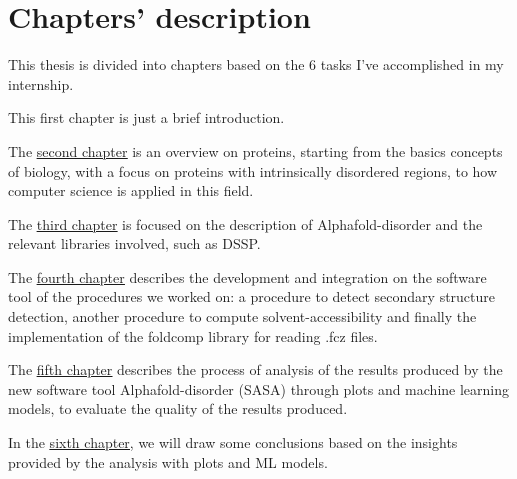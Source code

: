 \section{Chapters' description}
This thesis is divided into chapters based on the 6 tasks I've accomplished in my internship.

This first chapter is just a brief introduction.

The \underline{\hyperref[chp:proteins]{second chapter}} is an overview on proteins, starting from the basics concepts of biology, with a focus on proteins with intrinsically disordered regions, to how computer science is applied in this field.

The \underline{\hyperref[chp:alphafold-disorder]{third chapter}} is focused on the description of Alphafold-disorder and the relevant libraries involved, such as DSSP.

The \underline{\hyperref[chp:development]{fourth chapter}} describes the development and integration on the software tool of the procedures we worked on: a procedure to detect secondary structure detection, another procedure to compute solvent-accessibility and finally the implementation of the foldcomp library for reading .fcz files.




The \underline{\hyperref[chp:analysis]{fifth chapter}} describes the process of analysis of the results produced by the new software tool Alphafold-disorder (SASA) through plots and machine learning models, to evaluate the quality of the results produced.

In the \underline{\hyperref[chp:conclusions]{sixth chapter}}, we will draw some conclusions based on the insights provided by the analysis with plots and ML models.

